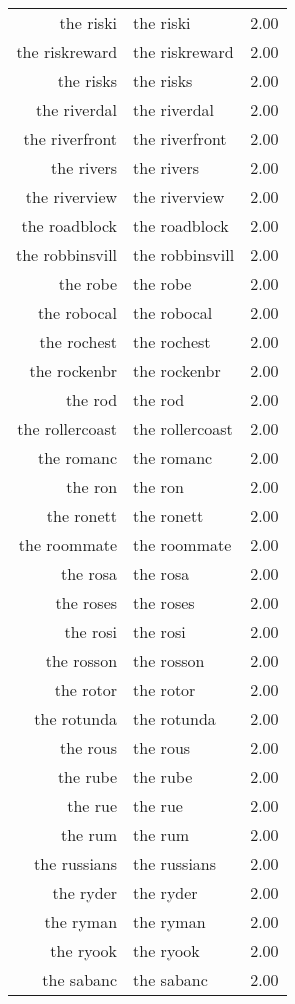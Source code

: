 \begin{table}[ht]
\begin{tabular}{rlr}
  the riski & the riski & 2.00 \\ 
  the riskreward & the riskreward & 2.00 \\ 
  the risks & the risks & 2.00 \\ 
  the riverdal & the riverdal & 2.00 \\ 
  the riverfront & the riverfront & 2.00 \\ 
  the rivers & the rivers & 2.00 \\ 
  the riverview & the riverview & 2.00 \\ 
  the roadblock & the roadblock & 2.00 \\ 
  the robbinsvill & the robbinsvill & 2.00 \\ 
  the robe & the robe & 2.00 \\ 
  the robocal & the robocal & 2.00 \\ 
  the rochest & the rochest & 2.00 \\ 
  the rockenbr & the rockenbr & 2.00 \\ 
  the rod & the rod & 2.00 \\ 
  the rollercoast & the rollercoast & 2.00 \\ 
  the romanc & the romanc & 2.00 \\ 
  the ron & the ron & 2.00 \\ 
  the ronett & the ronett & 2.00 \\ 
  the roommate & the roommate & 2.00 \\ 
  the rosa & the rosa & 2.00 \\ 
  the roses & the roses & 2.00 \\ 
  the rosi & the rosi & 2.00 \\ 
  the rosson & the rosson & 2.00 \\ 
  the rotor & the rotor & 2.00 \\ 
  the rotunda & the rotunda & 2.00 \\ 
  the rous & the rous & 2.00 \\ 
  the rube & the rube & 2.00 \\ 
  the rue & the rue & 2.00 \\ 
  the rum & the rum & 2.00 \\ 
  the russians & the russians & 2.00 \\ 
  the ryder & the ryder & 2.00 \\ 
  the ryman & the ryman & 2.00 \\ 
  the ryook & the ryook & 2.00 \\ 
  the sabanc & the sabanc & 2.00 \\ 

\end{tabular}
\end{table}
